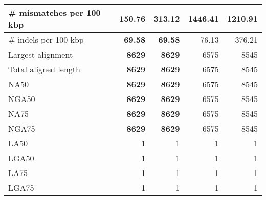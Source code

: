 \documentclass[12pt,a4paper]{article}
\begin{document}
\begin{table}[ht]
\begin{center}
\begin{tabular}{|l*{4}{|r}|}
\# mismatches per 100 kbp & {\bf 150.76} & 313.12 & 1446.41 & 1210.91 \\ \hline
\# indels per 100 kbp & {\bf 69.58} & {\bf 69.58} & 76.13 & 376.21 \\ \hline
Largest alignment & {\bf 8629} & {\bf 8629} & 6575 & 8545 \\ \hline
Total aligned length & {\bf 8629} & {\bf 8629} & 6575 & 8545 \\ \hline
NA50 & {\bf 8629} & {\bf 8629} & 6575 & 8545 \\ \hline
NGA50 & {\bf 8629} & {\bf 8629} & 6575 & 8545 \\ \hline
NA75 & {\bf 8629} & {\bf 8629} & 6575 & 8545 \\ \hline
NGA75 & {\bf 8629} & {\bf 8629} & 6575 & 8545 \\ \hline
LA50 & 1 & 1 & 1 & 1 \\ \hline
LGA50 & 1 & 1 & 1 & 1 \\ \hline
LA75 & 1 & 1 & 1 & 1 \\ \hline
LGA75 & 1 & 1 & 1 & 1 \\ \hline
\end{tabular}
\end{center}
\end{table}
\end{document}
